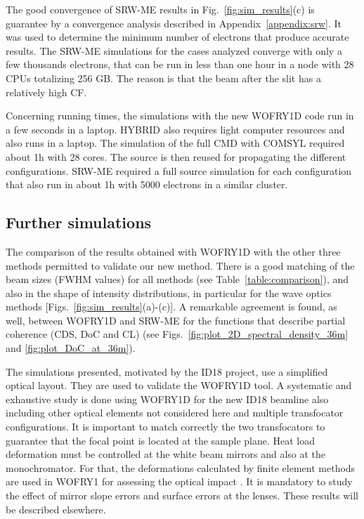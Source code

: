 \documentclass{iucr}              %
\begin{document}
The good convergence of SRW-ME results in Fig.~\ref{fig:sim_results}(c) is guarantee by a convergence analysis described in Appendix~\ref{appendix:srw}. It was used to determine the minimum number of electrons that produce accurate results. The SRW-ME simulations for the cases analyzed converge with only a few thousands electrons, that can be run in less than one hour in a node with 28 CPUs totalizing 256 GB. The reason is that the beam after the slit has a relatively high CF. 

Concerning running times, the simulations with the new WOFRY1D code run in a few seconds in a laptop.
HYBRID also requires light computer resources and also runs in a laptop. 
The simulation of the full CMD with COMSYL required about 1h with 28 cores. The source is then reused for propagating the different configurations. SRW-ME required a full source simulation for each configuration that also run in about 1h with 5000 electrons in a similar cluster. 


\subsection{Further simulations}
\label{sec:discussion}

The comparison of the results obtained with WOFRY1D with the other three methods permitted to validate our new method.
There is a good matching of the beam sizes (FWHM values) for all methods (see Table~\ref{table:comparison}), and also in the shape of intensity distributions, in particular for the wave optics methods [Figs.~\ref{fig:sim_results}(a)-(c)]. 
A remarkable agreement is found, as well, between WOFRY1D and SRW-ME for the functions that describe partial coherence (CDS, DoC and CL) (see Figs.~\ref{fig:plot_2D_spectral_density_36m} and \ref{fig:plot_DoC_at_36m}).

The simulations presented, motivated by the ID18 project, use a simplified optical layout. They are used to validate the WOFRY1D tool. 
A systematic and exhaustive study is done using WOFRY1D for the new ID18 beamline also including other optical elements not considered here and multiple transfocator configurations. It is important to match correctly the two transfocators to guarantee that the focal point is located at the sample plane. Heat load deformation must be controlled at the white beam mirrors and also at the monochromator. For that, the deformations calculated by finite element methods are used in WOFRY1 for assessing the optical impact \cite{srioLBL}. It is mandatory to study the effect of mirror slope errors and surface errors at the lenses. These results will be described elsewhere.
\end{document}
